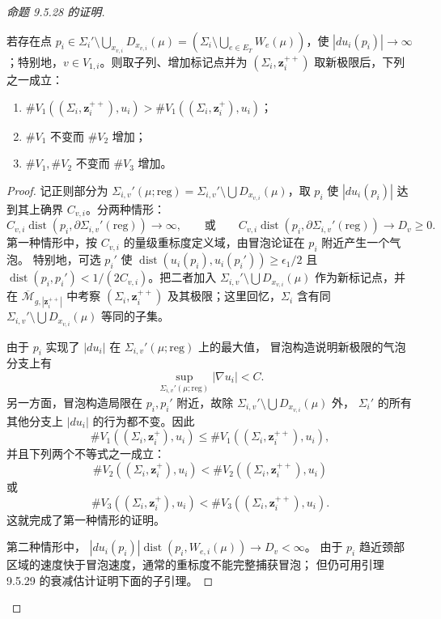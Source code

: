 \begin{proof}[命题 9.5.28 的证明]
\begin{lemma}\label{lem:marked-points-increase-complexity}
若存在点
$p_i\in\Sigma_i'\setminus\bigcup_{x_{v,i}}D_{x_{v,i}}(\mu)
=(\Sigma_i\setminus\bigcup_{e\in E_T}W_e(\mu))$，使
$|du_i(p_i)|\to\infty$；特别地，$v\in V_{1,i}$。则取子列、增加标记点并为
$(\Sigma_i,\boldsymbol z_i^{++})$ 取新极限后，下列之一成立：
\begin{enumerate}[label=(\arabic*)]
 \item $\#V_1((\Sigma_i,\boldsymbol z_i^{++}),u_i)>
 \#V_1((\Sigma_i,\boldsymbol z_i^+),u_i)$；
 \item $\#V_1$ 不变而 $\#V_2$ 增加；
 \item $\#V_1,\#V_2$ 不变而 $\#V_3$ 增加。
\end{enumerate}
\end{lemma}

\begin{proof}
记正则部分为
$\Sigma_{i,v}'(\mu;\mathrm{reg})=
\Sigma_{i,v}'\setminus\bigcup D_{x_{v,i}}(\mu)$，取 $p_i$ 使
$|du_i(p_i)|$ 达到其上确界 $C_{v,i}$。分两种情形：
\[
 C_{v,i}\operatorname{dist}(p_i,\partial\Sigma_{i,v}'(\mathrm{reg}))
 \to\infty,
 \qquad\text{或}\qquad
 C_{v,i}\operatorname{dist}(p_i,\partial\Sigma_{i,v}'(\mathrm{reg}))
 \to D_v\ge0.
\]
第一种情形中，按 $C_{v,i}$ 的量级重标度定义域，由冒泡论证在 $p_i$ 附近产生一个气泡。
特别地，可选 $p_i'$ 使
$\operatorname{dist}(u_i(p_i),u_i(p_i'))\ge\epsilon_1/2$ 且
$\operatorname{dist}(p_i,p_i')<1/(2C_{v,i})$。把二者加入
$\Sigma_{i,v}'\setminus\bigcup D_{x_{v,i}}(\mu)$ 作为新标记点，并在
$\overline{\mathcal M}_{g,|\boldsymbol z_i^{++}|}$ 中考察
$(\Sigma_i,\boldsymbol z_i^{++})$ 及其极限；这里回忆，$\Sigma_i$ 含有同
$\Sigma_{i,v}'\setminus\bigcup D_{x_{v,i}}(\mu)$ 等同的子集。

由于 $p_i$ 实现了 $|du_i|$ 在 $\Sigma_{i,v}'(\mu;\mathrm{reg})$ 上的最大值，
冒泡构造说明新极限的气泡分支上有
\[
 \sup_{\Sigma_{i,v}'(\mu;\mathrm{reg})}|\nabla u_i|<C.
\]
另一方面，冒泡构造局限在 $p_i,p_i'$ 附近，故除
$\Sigma_{i,v}'\setminus\bigcup D_{x_{v,i}}(\mu)$ 外，
$\Sigma_i'$ 的所有其他分支上 $|du_i|$ 的行为都不变。因此
\[
 \#V_1((\Sigma_i,\boldsymbol z_i^+),u_i)
 \le\#V_1((\Sigma_i,\boldsymbol z_i^{++}),u_i),
\]
并且下列两个不等式之一成立：
\[
 \#V_2((\Sigma_i,\boldsymbol z_i^+),u_i)
 <\#V_2((\Sigma_i,\boldsymbol z_i^{++}),u_i)
\]
或
\[
 \#V_3((\Sigma_i,\boldsymbol z_i^+),u_i)
 <\#V_3((\Sigma_i,\boldsymbol z_i^{++}),u_i).
\]
这就完成了第一种情形的证明。

第二种情形中，
$|du_i(p_i)|\operatorname{dist}(p_i,W_{e,i}(\mu))\to D_v<\infty$。
由于 $p_i$ 趋近颈部区域的速度快于冒泡速度，通常的重标度不能完整捕获冒泡；
但仍可用引理 9.5.29 的衰减估计证明下面的子引理。


\end{proof}
\end{proof}
